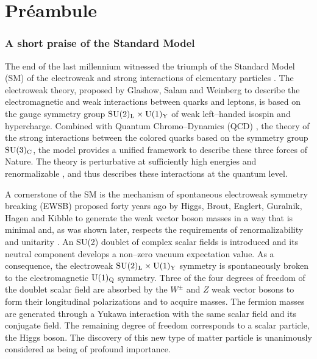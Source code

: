 \setcounter{section}{0} 
\renewcommand{\thesection}{}

\section{\hspace*{-.5cm} Pr\'eambule}

\subsubsection*{A short praise of the Standard Model}

The end of the last millennium witnessed the triumph of the Standard Model (SM)
of the electroweak and strong interactions of elementary particles
\cite{GSW,QCD}.  The electroweak theory, proposed by Glashow, Salam and
Weinberg \cite{GSW} to describe the electromagnetic \cite{QED} and weak
\cite{WEAK} interactions between quarks and leptons, is based on the gauge
symmetry group ${\rm SU(2)_L \times U(1)_Y}$ of weak left--handed isospin and
hypercharge. Combined with Quantum Chromo--Dynamics (QCD) \cite{QCD}, the
theory of the strong interactions between the colored quarks based on the 
symmetry group ${\rm SU(3)_C}$, the model provides a unified framework to
describe these three forces of Nature. The theory is perturbative at
sufficiently high energies \cite{QCD} and renormalizable \cite{RENORM}, and
thus describes these interactions at the quantum level.\s

A cornerstone of the SM is the mechanism of spontaneous electroweak symmetry
breaking (EWSB) proposed forty years ago by Higgs, Brout, Englert, Guralnik,
Hagen and Kibble \cite{Higgs} to generate the weak vector boson masses in a way
that is minimal and, as was shown later, respects the requirements of
renormalizability \cite{RENORM} and unitarity \cite{UNITARITY}.  An SU(2)
doublet of complex scalar fields is introduced and its neutral component
develops a non--zero vacuum expectation value. As a consequence, the
electroweak ${\rm SU(2)_L \times U(1)_Y}$ symmetry is spontaneously broken to
the electromagnetic ${\rm U(1)_Q}$ symmetry.  Three of the four degrees of
freedom of the doublet scalar field are absorbed by the $W^\pm$ and $Z$ weak
vector bosons to form their longitudinal polarizations and to acquire masses. 
The fermion masses are generated through a Yukawa interaction with the same
scalar field and its conjugate field.  The remaining degree of freedom
corresponds to a scalar particle, the Higgs boson. The discovery of this new
type of matter particle is unanimously considered as being of profound
importance.\s

